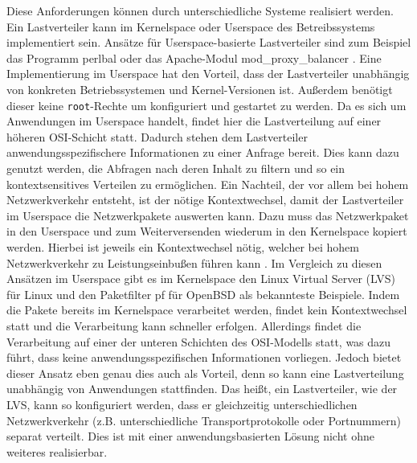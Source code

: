 \documentclass[a4paper, 12pt, BCOR10mm, DIV12, toc=bibliography, toc=listof, german]{scrbook}
\begin{document}
			Diese Anforderungen können durch unterschiedliche Systeme realisiert werden. Ein Lastverteiler
			kann im Kernelspace oder Userspace des Betreibssystems
			implementiert sein. Ansätze für Userspace-basierte Lastverteiler sind zum Beispiel das Programm
			perlbal \cite{perlbal} oder das Apache-Modul mod\_proxy\_balancer \cite{modproxy}.  Eine
			Implementierung im Userspace hat den Vorteil, dass der Lastverteiler unabhängig von konkreten
			Betriebssystemen und Kernel-Versionen ist. Außerdem benötigt dieser keine \texttt{root}-Rechte
			um konfiguriert und gestartet zu werden. Da es sich um Anwendungen im Userspace handelt,
			findet hier die Lastverteilung auf einer höheren OSI-Schicht \cite{tanenbaum1988} statt.
			Dadurch stehen dem Lastverteiler anwendungsspezifischere Informationen zu einer Anfrage
			bereit. Dies kann dazu genutzt werden, die Abfragen nach deren Inhalt zu filtern
			und so ein kontextsensitives Verteilen zu ermöglichen.  Ein Nachteil, der vor allem bei
			hohem Netzwerkverkehr entsteht, ist der nötige Kontextwechsel, damit der Lastverteiler
			im Userspace die Netzwerkpakete auswerten kann. Dazu muss das Netzwerkpaket in den Userspace
			und zum Weiterversenden wiederum in den Kernelspace kopiert werden. Hierbei ist jeweils ein
			Kontextwechsel nötig, welcher bei hohem Netzwerkverkehr zu Leistungseinbußen führen kann
			\cite{boehme2006}.  Im Vergleich zu diesen Ansätzen im Userspace gibt es im Kernelspace den
			Linux Virtual Server (LVS) \cite{lvs,zhang2000} für Linux und den Paketfilter pf \cite{pf} für
			OpenBSD als bekannteste Beispiele.  Indem die Pakete bereits im Kernelspace verarbeitet
			werden, findet kein Kontextwechsel statt und die Verarbeitung kann schneller erfolgen.
			Allerdings findet die Verarbeitung auf einer der unteren Schichten des OSI-Modells statt, was
			dazu führt, dass keine anwendungsspezifischen Informationen vorliegen. Jedoch bietet dieser
			Ansatz eben genau dies auch als Vorteil, denn so kann eine Lastverteilung unabhängig von
			Anwendungen stattfinden.  Das heißt, ein Lastverteiler, wie der LVS, kann so konfiguriert
			werden, dass er gleichzeitig unterschiedlichen Netzwerkverkehr (z.B. unterschiedliche
			Transportprotokolle oder Portnummern) separat verteilt. Dies ist mit einer anwendungsbasierten
			Lösung nicht ohne weiteres realisierbar.
\end{document}
